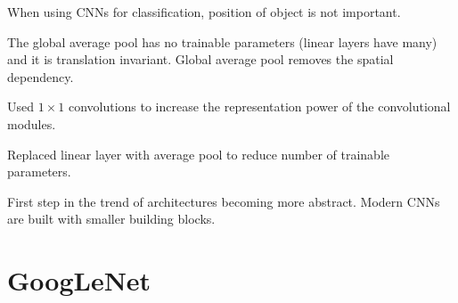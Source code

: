 \begin{concept}
    When using CNNs for classification, position of object is not important.

    The global average pool has no trainable parameters (linear layers have many) and it is translation invariant. Global average pool removes the spatial dependency.
\end{concept}

\begin{concept}
    Used $1 \times 1$ convolutions to increase the representation power of the convolutional modules.

    Replaced linear layer with average pool to reduce number of trainable parameters.

    First step in the trend of architectures becoming more abstract. Modern CNNs are built with smaller building blocks.
\end{concept}

\section{GoogLeNet}

